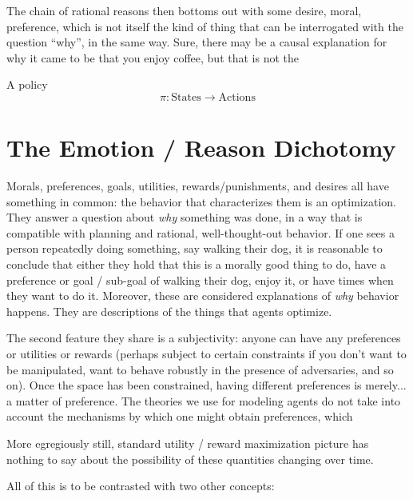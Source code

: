 \documentclass{book}
\begin{document}
	The chain of rational reasons then bottoms out with some desire, moral, preference, which is not itself the kind of thing that can be interrogated with the question ``why'', in the same way. Sure, there may be a causal explanation for why it came to be that you enjoy coffee, but that is not the 
	
	
			
	A policy
	\[ \pi: \mathrm{States} \to \mathrm{Actions} \]
	
	
	
	
	\section{The Emotion / Reason Dichotomy}
	Morals, preferences, goals, utilities, rewards/punishments, and desires all have something in common: the behavior that characterizes them is an optimization. They answer a question about \emph{why} something was done, in a way that is compatible with planning and rational, well-thought-out behavior. If one sees a person repeatedly doing something, say walking their dog, it is reasonable to conclude that either they hold that this is a morally good thing to do, have a preference or goal / sub-goal of walking their dog, enjoy it, or have times when they want to do it. Moreover, these are considered explanations of \emph{why} behavior happens. They are descriptions of the things that agents optimize.
	
	The second feature they share is a subjectivity: anyone can have any preferences or utilities or rewards (perhaps subject to certain constraints if you don't want to be manipulated, want to behave robustly in the presence of adversaries, and so on). Once the space has been constrained, having different preferences is merely... a matter of preference. The theories we use for modeling agents do not take into account the mechanisms by which one might obtain preferences, which 
	
	More egregiously still, standard utility / reward maximization picture has nothing to say about the possibility of these quantities changing over time.
	
	
	
	All of this is to be contrasted with two other concepts:
\end{document}
